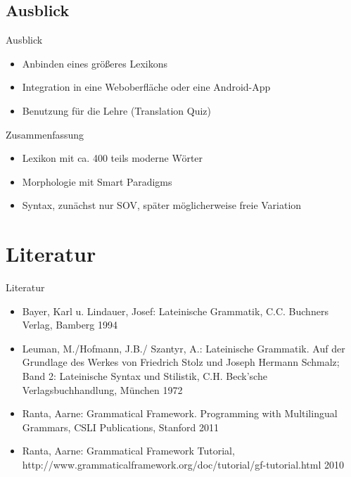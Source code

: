 \documentclass{beamer}
\begin{document}
\subsection{Ausblick}
\begin{frame}{Ausblick}
\begin{itemize}
\item Anbinden eines größeres Lexikons
\item Integration in eine Weboberfläche oder eine Android-App
\item Benutzung für die Lehre (Translation Quiz)
\end{itemize}
\end{frame}
\begin{frame}{Zusammenfassung}
\begin{itemize}
  \item Lexikon mit ca. 400 teils moderne Wörter
  \item Morphologie mit Smart Paradigms
  \item Syntax, zunächst nur SOV, später möglicherweise freie Variation
\end{itemize}
\end{frame}
\section{Literatur}
\begin{frame}{Literatur}
\begin{itemize}
  \item Bayer, Karl u. Lindauer, Josef: Lateinische Grammatik, C.C. Buchners Verlag, Bamberg 1994
  \item Leuman, M./Hofmann, J.B./ Szantyr, A.: Lateinische Grammatik. Auf der Grundlage des Werkes von Friedrich Stolz und Joseph Hermann Schmalz; Band 2: Lateinische Syntax und Stilistik, C.H. Beck'sche Verlagsbuchhandlung, München 1972
  \item Ranta, Aarne: Grammatical Framework. Programming with Multilingual Grammars, CSLI Publications, Stanford 2011 
  \item Ranta, Aarne: Grammatical Framework Tutorial, http://www.grammaticalframework.org/doc/tutorial/gf-tutorial.html 2010
\end{itemize}
\end{frame}
\end{document}
